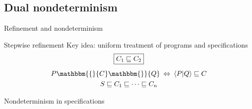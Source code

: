 \documentclass[aspectratio=141]{beamer}
\newcommand{\htr}[3]{{ {#1} \mathbbm{\{} {#2} \mathbbm{\}} {#3} }}
\begin{document}
\subsection{Dual nondeterminism}

\begin{frame}{Refinement and nondeterminism} %
  \begin{block}{Stepwise refinement}
  Key idea: uniform treatment of programs and specifications
  \begin{gather*}
    \fbox{$C_1 \sqsubseteq C_2$} \\[1ex]
    \htr{P}{C}{Q} \: \Leftrightarrow \:
      \langle P | Q \rangle \sqsubseteq C \\
    S \sqsubseteq C_1 \sqsubseteq \cdots \sqsubseteq C_n
  \end{gather*}
  \end{block}
  \pause
  \begin{block}{Nondeterminism in specifications}
\end{block}
\end{frame}
\end{document}
